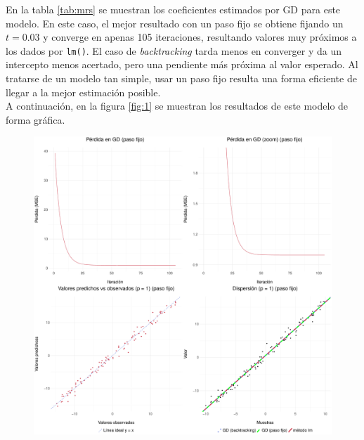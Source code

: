 \documentclass[11pt]{opticajnl}
\begin{document}
En la tabla \ref{tab:mrs} se muestran los coeficientes estimados por GD para este modelo. En este caso, el mejor resultado con un paso fijo se obtiene fijando un $t=0.03$ y converge en apenas 105 iteraciones, resultando valores muy próximos a los dados por \texttt{lm()}. El caso de \textit{backtracking} tarda menos en converger y da un intercepto menos acertado, pero una pendiente más próxima al valor esperado. Al tratarse de un modelo tan simple, usar un paso fijo resulta una forma eficiente de llegar a la mejor estimación posible. \\

\noindent A continuación, en la figura \ref{fig:1} se muestran los resultados de este modelo de forma gráfica.

\begin{figure}[H]
\centering
\includegraphics[width=\textwidth]{fotos/plotmrs.pdf}
\end{figure}
\end{document}
